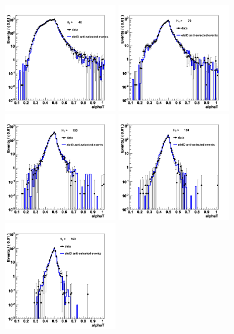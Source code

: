 \begin{figure}[h!]
\includegraphics[width=50mm]{Plots/mc-alphaT-1}
\includegraphics[width=50mm]{Plots/mc-alphaT-2}
\includegraphics[width=50mm]{Plots/mc-alphaT-3}
\includegraphics[width=50mm]{Plots/mc-alphaT-4}
\hspace*{3mm}
\includegraphics[width=50mm]{Plots/mc-alphaT-5}

\end{figure}
